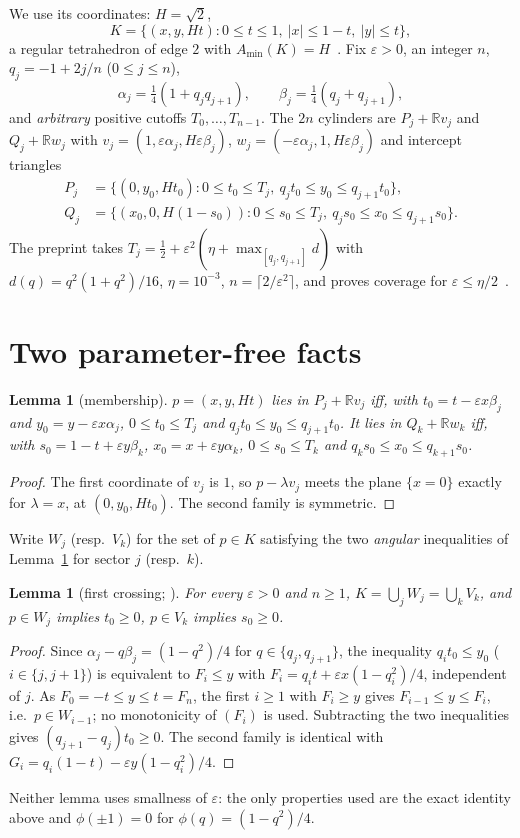 \documentclass[11pt]{amsart}
\newtheorem{lemma}[theorem]{Lemma}
\theoremstyle{remark}
\newcommand{\R}{\mathbb{R}}
\newcommand{\eps}{\varepsilon}
\begin{document}
We use its coordinates: $H=\sqrt2$,
\[
K=\{(x,y,Ht):0\le t\le1,\ |x|\le1-t,\ |y|\le t\},
\]
a regular tetrahedron of edge $2$ with $A_{\min}(K)=H$~\cite[\S2, \texttt{lem:projection-minimum}]{OAI100}.
Fix $\eps>0$, an integer $n$, $q_j=-1+2j/n$ ($0\le j\le n$),
\[
\alpha_j=\tfrac14(1+q_jq_{j+1}),\qquad \beta_j=\tfrac14(q_j+q_{j+1}),
\]
and \emph{arbitrary} positive cutoffs $T_0,\dots,T_{n-1}$. The $2n$ cylinders are
$P_j+\R v_j$ and $Q_j+\R w_j$ with $v_j=(1,\eps\alpha_j,H\eps\beta_j)$,
$w_j=(-\eps\alpha_j,1,H\eps\beta_j)$ and intercept triangles
\begin{align*}
P_j&=\{(0,y_0,Ht_0):0\le t_0\le T_j,\ q_jt_0\le y_0\le q_{j+1}t_0\},\\
Q_j&=\{(x_0,0,H(1-s_0)):0\le s_0\le T_j,\ q_js_0\le x_0\le q_{j+1}s_0\}.
\end{align*}
The preprint takes $T_j=\frac12+\eps^2(\eta+\max_{[q_j,q_{j+1}]}d)$ with
$d(q)=q^2(1+q^2)/16$, $\eta=10^{-3}$, $n=\lceil2/\eps^2\rceil$, and proves coverage for
$\eps\le\eta/2$~\cite[\S3, \texttt{prop:coverage}]{OAI100}.

\section{Two parameter-free facts}
\begin{lemma}[membership]\label{lem:member}
$p=(x,y,Ht)$ lies in $P_j+\R v_j$ iff, with $t_0=t-\eps x\beta_j$ and $y_0=y-\eps x\alpha_j$,
$0\le t_0\le T_j$ and $q_jt_0\le y_0\le q_{j+1}t_0$. It lies in $Q_k+\R w_k$ iff, with
$s_0=1-t+\eps y\beta_k$, $x_0=x+\eps y\alpha_k$, $0\le s_0\le T_k$ and $q_ks_0\le x_0\le q_{k+1}s_0$.
\end{lemma}
\begin{proof}
The first coordinate of $v_j$ is $1$, so $p-\lambda v_j$ meets the plane $\{x=0\}$ exactly for
$\lambda=x$, at $(0,y_0,Ht_0)$. The second family is symmetric.
\end{proof}

Write $W_j$ (resp.\ $V_k$) for the set of $p\in K$ satisfying the two \emph{angular} inequalities
of Lemma~\ref{lem:member} for sector $j$ (resp.\ $k$).

\begin{lemma}[first crossing; {\cite[proof of \texttt{prop:coverage}, lines 13--45 of \texttt{coverage.tex}]{OAI100}}]\label{lem:select}
For every $\eps>0$ and $n\ge1$, $K=\bigcup_jW_j=\bigcup_kV_k$, and $p\in W_j$ implies $t_0\ge0$,
$p\in V_k$ implies $s_0\ge0$.
\end{lemma}
\begin{proof}
Since $\alpha_j-q\beta_j=(1-q^2)/4$ for $q\in\{q_j,q_{j+1}\}$, the inequality $q_it_0\le y_0$
($i\in\{j,j+1\}$) is equivalent to $F_i\le y$ with $F_i=q_it+\eps x(1-q_i^2)/4$, independent of $j$.
As $F_0=-t\le y\le t=F_n$, the first $i\ge1$ with $F_i\ge y$ gives $F_{i-1}\le y\le F_i$, i.e.\
$p\in W_{i-1}$; no monotonicity of $(F_i)$ is used. Subtracting the two inequalities gives
$(q_{j+1}-q_j)t_0\ge0$. The second family is identical with $G_i=q_i(1-t)-\eps y(1-q_i^2)/4$.
\end{proof}
Neither lemma uses smallness of $\eps$: the only properties used are the exact identity above and
$\phi(\pm1)=0$ for $\phi(q)=(1-q^2)/4$.
\end{document}
